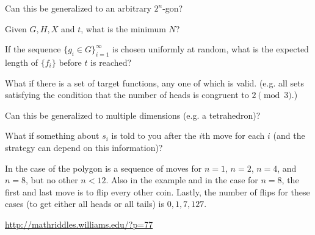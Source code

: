 \documentclass{article}
\begin{document}
\begin{related}
  \item Can this be generalized to an arbitrary $2^n$-gon?
  \item Given $G, H, X$ and $t$, what is the minimum $N$?
  \item If the sequence $\{g_i \in G\}_{i=1}^\infty$ is chosen uniformly at
  random, what is the expected length of $\{f_i\}$ before $t$ is reached?
  \item What if there is a set of target functions, any one of which is valid.
  (e.g. all sets satisfying the condition that the number of heads is congruent
  to $2 \pmod 3$.)
  \item Can this be generalized to multiple dimensions (e.g. a tetrahedron)?
  \item What if something about $s_i$ is told to you after the $i$th move for each
    $i$ (and the strategy can depend on this information)?
\end{related}

\begin{note}
  In the case of the polygon is a sequence of moves for $n=1$, $n=2$, $n=4$, and $n=8$, but no other
  $n < 12$. Also in the example and in the case for $n=8$, the first and last move is to flip every other coin.
  Lastly, the number of flips for these cases (to get either all heads or all tails)
  is $0, 1, 7, 127$.
\end{note}

\begin{references}
  \item \url{http://mathriddles.williams.edu/?p=77}
\end{references}
\end{document}
